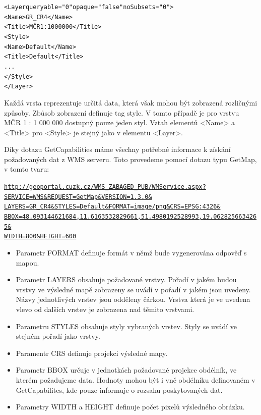 \documentclass[a4paper,12pt]{article}
\begin{document}
\begin{alltt}\footnotesize

<Layer queryable="0" opaque="false" noSubsets="0">
    <Name>GR_CR4</Name>
    <Title>MČR 1 : 1 000 000</Title>
    <Style>
        <Name>Default</Name>
        <Title>Default</Title>
          ...
    </Style>
</Layer>
\end{alltt}


Každá vrsta reprezentuje určitá data, která však mohou být zobrazená rozličnými způsoby. Zbůsob zobrazení definuje tag style. V tomto případě  je pro vrstvu MČR 1 : 1 000 000 
dostupný pouze jeden styl. Vztah elementů <Name> a <Title> pro <Style> je stejný jako v elementu <Layer>.

Díky dotazu GetCapabilities máme všechny potřebné informace k získání požadovaných dat z WMS serveru. 
Toto provedeme pomocí dotazu typu GetMap, v tomto tvaru:



\newcommand{\CUZKgetMap}{http://geoportal.cuzk.cz/WMS_ZABAGED_PUB/WMService.aspx?SERVICE=WMS&REQUEST=GetMap&VERSION=1.3.0&LAYERS=GR_CR4&STYLES=Default&FORMAT=image/png&CRS=EPSG:4326&BBOX=48.093144621684,11.6163532829661,51.4980192528993,19.0628256634265&WIDTH=800&HEIGHT=600}
\begin{alltt}\footnotesize
\href{\CUZKgetMap}{http://geoportal.cuzk.cz/WMS\_ZABAGED\_PUB/WMService.aspx?}
\href{\CUZKgetMap}{SERVICE=WMS\&REQUEST=GetMap\&VERSION=1.3.0\&}
\href{\CUZKgetMap}{LAYERS=GR\_CR4\&STYLES=Default\&FORMAT=image/png\&CRS=EPSG:4326\&}
\href{\CUZKgetMap}{BBOX=48.093144621684,11.6163532829661,51.4980192528993,19.0628256634265\&}
\href{\CUZKgetMap}{WIDTH=800\&HEIGHT=600}
\end{alltt}


\begin{itemize}
  \item Parametr FORMAT definuje formát v němž bude vygenerována odpověď s mapou. 
  \item Parametr LAYERS obsahuje požadované vrstvy. Pořadí v jakém budou vrstvy ve výsledné mapě zobrazeny se uvádí v pořadí v jakém jsou uvedeny. Názvy jednotlivých vrstev 
        jsou odděleny čárkou. Vrstva která je ve uvedena vlevo od dalších vrstev je zobrazena nad těmito vrstvami.
  \item Parametru STYLES obsahuje styly vybraných vrstev. Styly se uvádí ve stejném pořadí jako vrstvy.    
  \item Paramentr CRS definuje projekci výsledné mapy. 
  \item Parametr BBOX určuje v jednotkách požadované projekce obdélník, ve kterém požadujeme data. Hodnoty mohou být i vně obdélníku definovaném v GetCapabilites,
	kde pouze informuje o rozsahu poskytovaných dat.  
  \item Parametry WIDTH a HEIGHT definuje počet pixelů výsledného obrázku. 
\end{itemize}
\end{document}
